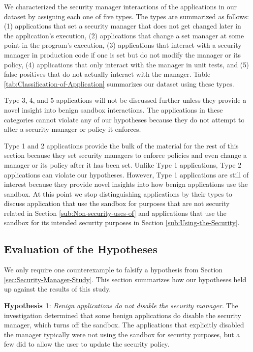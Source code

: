 \documentclass{sig-alternate}
\begin{document}
We characterized the security manager interactions of the applications in our dataset by assigning each one of five types. The
types are summarized as follows: (1) applications that set a
security manager that does not get changed later in the application's
execution, (2) applications that change a set manager at some point
in the program's execution, (3) applications that interact with a
security manager in production code if one is set but do not modify the manager or its policy, (4) applications
that only interact with the manager in unit tests, and (5) false positives
that do not actually interact with the manager. Table \ref{tab:Classification-of-Application}
summarizes our dataset using these types.

Type 3, 4, and 5 applications will not be discussed further unless they provide a novel insight into benign sandbox interactions. The applications in these categories cannot violate any of our hypotheses because they do not attempt to alter a security manager or policy it enforces.

Type 1 and 2 applications provide the bulk of the material for the rest of this section because they set security managers to enforce policies and even change a manager or its policy after it has been set. Unlike Type 1 applications, Type 2 applications can violate our hypotheses. However, Type 1 applications are still of interest because they provide novel insights into how benign applications use the sandbox. At this point we stop distinguishing applications by their types to discuss application that use the sandbox for purposes that are not security related in Section \ref{sub:Non-security-uses-of}
and applications that use the sandbox for its intended security purposes in Section \ref{sub:Using-the-Security}.

\subsection{Evaluation of the Hypotheses}\label{sub:Evaluation-of-the-hypotheses}

We only require one counterexample to falsify a hypothesis from Section
\ref{sec:Security-Manager-Study}. This section summarizes how our
hypotheses held up against the results of this study.

\textbf{Hypothesis 1}: \emph{Benign applications do not disable
the security manager.} The investigation determined
that some benign applications do disable the security manager, which
turns off the sandbox. The applications that explicitly disabled the
manager typically were not using the sandbox for security purposes, but a few did to allow the user to update the security policy.
\end{document}
